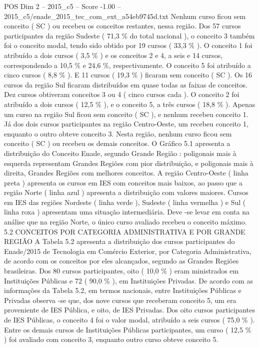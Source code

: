 \begin{textsample}{POS Dim 2 – 2015\_c5 – Score -1.00 – 2015\_c5/enade\_2015\_tec\_com\_ext\_a54eb9745d.txt}
Nenhum curso ficou sem conceito ( SC ) ou recebeu os conceitos restantes, nessa região.
Dos 57 cursos participantes da região Sudeste ( 71,3 \% do total nacional ), o conceito 3 também foi o conceito modal, tendo sido obtido por 19 cursos ( 33,3 \% ).
O conceito 1 foi atribuído a dois cursos ( 3,5 \% ) e os conceitos 2 e 4, a seis e 14 cursos, correspondendo a 10,5 \% e 24,6 \%, respectivamente.
O conceito 5 foi atribuído a cinco cursos ( 8,8 \% ).
E 11 cursos ( 19,3 \% ) ficaram sem conceito ( SC ).
Os 16 cursos da região Sul ficaram distribuídos em quase todas as faixas de conceitos.
Dez cursos obtiveram conceitos 3 ou 4 ( cinco cursos cada ).
O conceito 2 foi atribuído a dois cursos ( 12,5 \% ), e o conceito 5, a três cursos ( 18,8 \% ).
Apenas um curso na região Sul ficou sem conceito ( SC ), e nenhum recebeu conceito 1.
Já dos dois cursos participantes na região Centro-Oeste, um recebeu conceito 1, enquanto o outro obteve conceito 3.
Nesta região, nenhum curso ficou sem conceito ( SC ) ou recebeu os demais conceitos.
O Gráfico 5.1 apresenta a distribuição do Conceito Enade, segundo Grande Região : poligonais mais à esquerda representam Grandes Regiões com pior distribuição, e poligonais mais à direita, Grandes Regiões com melhores conceitos.
A região Centro-Oeste ( linha preta ) apresenta os cursos em IES com conceitos mais baixos, ao passo que a região Norte ( linha azul ) apresenta a distribuição com valores maiores.
Cursos em IES das regiões Nordeste ( linha verde ), Sudeste ( linha vermelha ) e Sul ( linha roxa ) apresentam uma situação intermediária.
Deve -se levar em conta na análise que na região Norte, o único curso avaliado recebeu o conceito máximo. 5.2 CONCEITOS POR CATEGORIA ADMINISTRATIVA E POR GRANDE REGIÃO A Tabela 5.2 apresenta a distribuição dos cursos participantes do Enade/2015 de Tecnologia em Comércio Exterior, por Categoria Administrativa, de acordo com os conceitos por eles alcançados, segundo as Grandes Regiões brasileiras.
Dos 80 cursos participantes, oito ( 10,0 \% ) eram ministrados em Instituições Públicas e 72 ( 90,0 \% ), em Instituições Privadas.
De acordo com as informações da Tabela 5.2, em termos nacionais, entre Instituições Públicas e Privadas observa -se que, dos nove cursos que receberam conceito 5, um era proveniente de IES Pública, e oito, de IES Privadas.
Dos oito cursos participantes de IES Públicas, o conceito 4 foi o valor modal, atribuído a seis cursos ( 75,0 \% ).
Entre os demais cursos de Instituições Públicas participantes, um curso ( 12,5 \% ) foi avaliado com conceito 3, enquanto outro curso obteve conceito 5.

\end{textsample}
